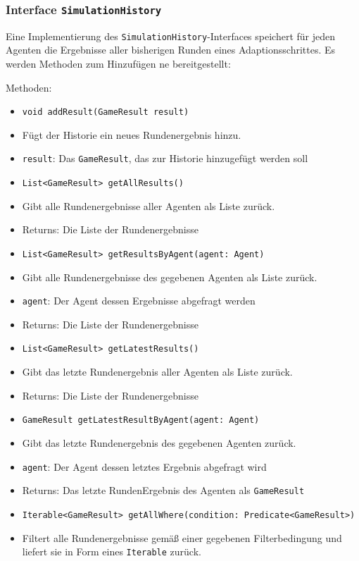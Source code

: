 \documentclass[parskip=full,11pt]{scrartcl}
\begin{document}
\subsubsection{Interface \texttt{SimulationHistory}}
Eine Implementierung des \texttt{SimulationHistory}-Interfaces speichert für jeden Agenten die Ergebnisse aller bisherigen Runden eines Adaptionsschrittes. Es werden Methoden zum Hinzufügen ne bereitgestellt:

Methoden:
\begin{itemize}\itemsep -10pt
	\item \texttt{void addResult(GameResult result)}
	\item[] Fügt der Historie ein neues Rundenergebnis hinzu.
	\item[] \texttt{result}: Das \texttt{GameResult}, das zur Historie hinzugefügt werden soll
	\item \texttt{List<GameResult> getAllResults()}
	\item[]Gibt alle Rundenergebnisse  aller Agenten als Liste zurück.
	\item[]Returns: Die Liste der Rundenergebnisse
	\item \texttt{List<GameResult> getResultsByAgent(agent: Agent)}
	\item[]Gibt alle Rundenergebnisse des gegebenen Agenten als Liste zurück.
	\item[] \texttt{agent}: Der Agent dessen Ergebnisse abgefragt werden
	\item[]Returns: Die Liste der Rundenergebnisse
	\item \texttt{List<GameResult> getLatestResults()}
	\item[]Gibt das letzte Rundenergebnis aller Agenten als Liste zurück.
	\item[]Returns: Die Liste der Rundenergebnisse
	\item \texttt{GameResult getLatestResultByAgent(agent: Agent)}
	\item[] Gibt das letzte Rundenergebnis des gegebenen Agenten zurück.
	\item[] \texttt{agent}: Der Agent dessen letztes Ergebnis abgefragt wird
	\item[]Returns: Das letzte RundenErgebnis des Agenten als \texttt{GameResult}
	\item \texttt{Iterable<GameResult> getAllWhere(condition: Predicate<GameResult>)}
	\item[] Filtert alle Rundenergebnisse gemäß einer gegebenen Filterbedingung und liefert sie in Form eines \texttt{Iterable} zurück.

\end{itemize}
\end{document}
